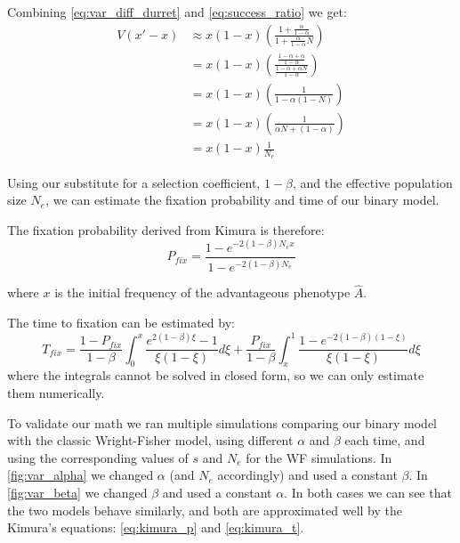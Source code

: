 \documentclass[11pt]{article}
\begin{document}
Combining \cref{eq:var_diff_durret} and \cref{eq:success_ratio} we get:
\begin{equation}\label{eq:const_var}
\begin{split}
V(x'-x) & \approx x(1-x)(\frac{1 + \frac{\alpha}{1-\alpha}}{1 + \frac{\alpha}{1-\alpha} N})\\
 &= x(1-x)(\frac{\frac{1-\alpha+\alpha}{1-\alpha}}{\frac{1-\alpha+\alpha N}{1-\alpha}})\\
 &= x(1-x)(\frac{1}{1- \alpha(1-N)})\\
  &= x(1-x)(\frac{1}{\alpha N + (1-\alpha)})\\
  &= x(1-x)\frac{1}{N_e}
\end{split}
\end{equation}

Using our substitute for a selection coefficient, $1-\beta$, and the effective population size $N_e$, we can estimate the fixation probability and time of our binary model.

The fixation probability derived from Kimura is therefore:
\begin{equation}\label{eq:kimura_p}
P_{fix} = \frac{1-e^{-2(1-\beta)N_e x}}{1-e^{-2(1-\beta)N_e}}
\end{equation}

where $x$ is the initial frequency of the advantageous phenotype $\hat{A}$.

The time to fixation can be estimated by:
\begin{equation}\label{eq:kimura_t}
T_{fix}=\frac{1-P_{fix}}{1-\beta}\int_0^x\frac{e^{2(1-\beta) \xi}-1}{\xi(1-\xi)}d\xi+ \frac{P_{fix}}{1-\beta}\int_x^1\frac{1-e^{-2(1-\beta)(1-\xi)}}{\xi(1-\xi)}d\xi
\end{equation}
where the integrals cannot be solved in closed form, so we can only estimate them numerically.

To validate our math we ran multiple simulations comparing our binary model with the classic Wright-Fisher model, using different $\alpha$ and $\beta$ each time, and using the corresponding values of $s$ and $N_e$ for the WF simulations.
In \cref{fig:var_alpha} we changed $\alpha$ (and $N_e$ accordingly) and used a constant $\beta$.
In \cref{fig:var_beta} we changed $\beta$ and used a constant $\alpha$.
In both cases we can see that the two models behave similarly, and both are approximated well by the Kimura's equations: \cref{eq:kimura_p} and \cref{eq:kimura_t}.
\end{document}
